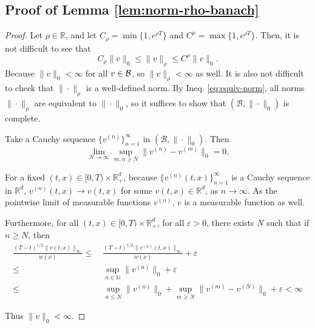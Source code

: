 \documentclass[11pt]{article}
\theoremstyle{definition}
\theoremstyle{plain}
\newcommand{\R}{\mathbb{R}}
\newcommand{\cB}{{\cal B}}
\newcommand{\veps}{\varepsilon}
\begin{document}
\begin{appendices}
\subsection{Proof of Lemma \ref{lem:norm-rho-banach}}
\begin{proof} Let $\rho \in \R$, and let \( C_\rho = \min\{1, e^{\rho T}\} \) and \( C^\rho = \max\{1, e^{\rho T}\} \).  
Then, it is not difficult to see that  
\begin{equation}\label{eq:equiv-norm}
C_\rho \|v\|_0 \leq \|v\|_\rho \leq C^\rho \|v\|_0.
\end{equation}
Because $\|v\|_0 < \infty$ for all $v \in \cB$, so $\|v\|_\rho < \infty$ as well. 
It is also not difficult to check that \( \|\cdot\|_\rho \) is a well-defined norm. 
By Ineq. \eqref{eq:equiv-norm}, all norms \( \|\cdot\|_\rho \) are equivalent to \( \|\cdot\|_0 \), 
so it suffices to show that \( (\mathcal{B}, \|\cdot\|_0) \) is complete.

Take a Cauchy sequence \( \{v^{(n)}\}_{n=1}^\infty \) in \( (\mathcal{B}, \|\cdot\|_0) \).  
Then  
\[
\lim_{N \to \infty} \sup_{m,n \geq N} \|v^{(n)} - v^{(m)}\|_0 = 0.
\]

For a fixed \( (t,x) \in [0,T) \times \mathbb{R}^d_+ \),  
because \( \{ v^{(n)}(t,x) \}_{n=1}^\infty \) is a Cauchy sequence in \( \mathbb{R}^d \), \( v^{(n)}(t,x) \to v(t,x) \) for some  
\( v(t,x) \in \mathbb{R}^d \), as \( n \to \infty \).
As the pointwise limit of measurable functions $v^{(n)}$, $v$ is a measurable function as well.

Furthermore, for all \( (t,x) \in [0,T) \times \mathbb{R}^d_+ \),  
for all \( \varepsilon > 0 \), there exists \( N \) such that if \( n \geq N \), then  
\begin{align*}
\frac{(T - t)^{1/2} \|v(t,x)\|_\infty}{w(x)} \leq &~\frac{(T - t)^{1/2} \|v^{(n)}(t,x)\|_\infty}{w(x)} + \varepsilon \\
\leq &~\sup_{n \in \mathbb{N}} \|v^{(n)}\|_0 + \varepsilon \\
\leq &~\sup_{n \le N} \|v^{(n)}\|_0 + \sup_{m \geq N} \|v^{(m)} - v^{(N)}\|_0 + \veps
< \infty
\end{align*}

Thus \( \|v\|_0 < \infty \).


\end{proof}
\end{appendices}
\end{document}
